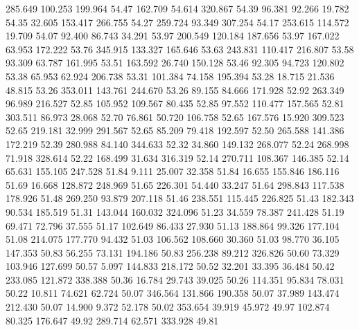  285.649  100.253  199.964        54.47
 162.709   54.614  320.867        54.39
  96.381   92.266   19.782        54.35
  32.605  153.417  266.755        54.27
 259.724   93.349  307.254        54.17
 253.615  114.572   19.709        54.07
  92.400   86.743   34.291        53.97
 200.549  120.184  187.656        53.97
 167.022   63.953  172.222        53.76
 345.915  133.327  165.646        53.63
 243.831  110.417  216.807        53.58
  93.309   63.787  161.995        53.51
 163.592   26.740  150.128        53.46
  92.305   94.723  120.802        53.38
  65.953   62.924  206.738        53.31
 101.384   74.158  195.394        53.28
  18.715   21.536   48.815        53.26
 353.011  143.761  244.670        53.26
  89.155   84.666  171.928        52.92
 263.349   96.989  216.527        52.85
 105.952  109.567   80.435        52.85
  97.552  110.477  157.565        52.81
 303.511   86.973   28.068        52.70
  76.861   50.720  106.758        52.65
 167.576   15.920  309.523        52.65
 219.181   32.999  291.567        52.65
  85.209   79.418  192.597        52.50
 265.588  141.386  172.219        52.39
 280.988   84.140  344.633        52.32
  34.860  149.132  268.077        52.24
 268.998   71.918  328.614        52.22
 168.499   31.634  316.319        52.14
 270.711  108.367  146.385        52.14
  65.631  155.105  247.528        51.84
   9.111   25.007   32.358        51.84
  16.655  155.846  186.116        51.69
  16.668  128.872  248.969        51.65
 226.301   54.440   33.247        51.64
 298.843  117.538  178.926        51.48
 269.250   93.879  207.118        51.46
 238.551  115.445  226.825        51.43
 182.343   90.534  185.519        51.31
 143.044  160.032  324.096        51.23
  34.559   78.387  241.428        51.19
  69.471   72.796   37.555        51.17
 102.649   86.433   27.930        51.13
 188.864   99.326  177.104        51.08
 214.075  177.770   94.432        51.03
 106.562  108.660   30.360        51.03
  98.770   36.105  147.353        50.83
  56.255   73.131  194.186        50.83
 256.238   89.212  326.826        50.60
  73.329  103.946  127.699        50.57
   5.097  144.833  218.172        50.52
  32.201   33.395   36.484        50.42
 233.085  121.872  338.388        50.36
  16.784   29.743   39.025        50.26
 114.351   95.834   78.031        50.22
  10.811   74.621   62.724        50.07
 346.564  131.866  190.358        50.07
  37.989  143.474  212.430        50.07
  14.900    9.372   52.178        50.02
 353.654   39.919   45.972        49.97
 102.874   80.325  176.647        49.92
 289.714   62.571  333.928        49.81
